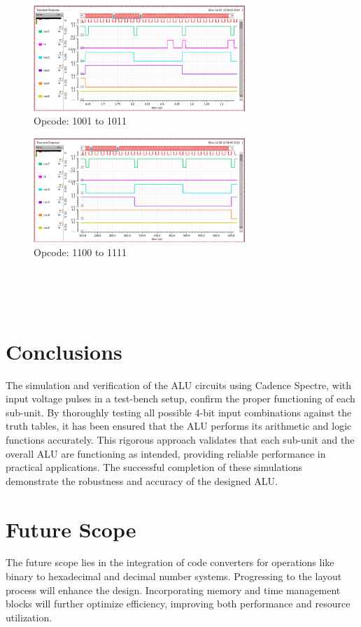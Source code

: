 \documentclass[conference]{IEEEtran}
\begin{document}
\begin{figure}[htbp]
\centerline{\includegraphics[width=8cm,keepaspectratio,]{"Opcode_1001_1011.png"}}
\caption{Opcode: 1001 to 1011}
\label{fig13}
\end{figure}
\begin{figure}[htbp]
\centerline{\includegraphics[width=8cm,keepaspectratio,]{"Opcode_1100_1111.png"}}
\caption{Opcode: 1100 to 1111}
\label{fig14}
\end{figure}
\\  \\ \\ 


\section{Conclusions}\label{F}
The simulation and verification of the ALU circuits using Cadence Spectre, with input voltage pulses in a test-bench setup, confirm the proper functioning of each sub-unit. By thoroughly testing all possible 4-bit input combinations against the truth tables, it has been ensured that the ALU performs its arithmetic and logic functions accurately. This rigorous approach validates that each sub-unit and the overall ALU are functioning as intended, providing reliable performance in practical applications. The successful completion of these simulations demonstrate the robustness and accuracy of the designed ALU. 
\\

\section{Future Scope}\label{G}
The future scope lies in the integration of code converters for operations like binary to hexadecimal and decimal number systems. Progressing to the layout process will enhance the design. Incorporating memory and time management blocks will further optimize efficiency, improving both performance and resource utilization.
\\ 
\end{document}
